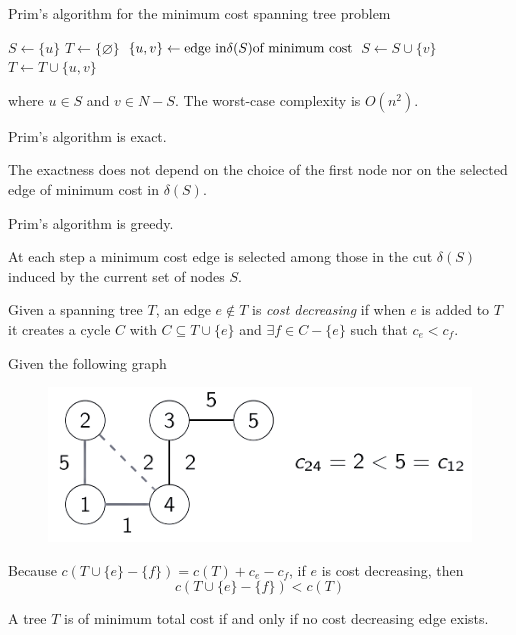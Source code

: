 \documentclass[12pt, a4paper]{report}
\newtheorem[style=M,bodystyle=\normalfont]{theorem}{Theorem}
\newtheorem[style=M,bodystyle=\normalfont]{corollary}{Corollary}
\newtheorem[style=M,bodystyle=\normalfont]{lemma}{Lemma}
\newtheorem[style=M,bodystyle=\normalfont]{definition}{Definition}
\begin{document}
    \begin{algorithm}[H]
        \caption{Prim's algorithm for the minimum cost spanning tree problem}
            \begin{algorithmic}[1]
                \State $S \leftarrow \{u\}$
                \State $T \leftarrow \{\varnothing\}$
                    \State $\{u,v\}\leftarrow \textnormal{edge in} \delta(S) \textnormal{of minimum cost}$
                    \State $S \leftarrow S \cup \{v\}$
                    \State $T \leftarrow T \cup \{u,v\}$
                \EndWhile
            \end{algorithmic}
    \end{algorithm}
    where $u \in S$ and $v \in N-S$. The worst-case complexity is $O(n^2)$. 
    \begin{example}[Proposition]
        Prim's algorithm is exact. 
    \end{example}        
    The exactness does not depend on the choice of the first node nor on the selected edge of minimum cost in $\delta(S)$. 
    \begin{example}[Proposition]
        Prim's algorithm is greedy. 
    \end{example}     
    At each step a minimum cost edge is selected among those in the cut $\delta (S)$ induced by the current set of nodes $S$. 
    \begin{definition}
        Given a spanning tree $T$, an edge $e \notin T$ is \emph{cost decreasing} if when $e$ is added to $T$ it creates a cycle $C$ with $C \subseteq T \cup \{e\}$ and 
        $\exists f \in C-\{e\}$ such that $c_e<c_f$. 
    \end{definition}
    \begin{example}
        Given the following graph
        \begin{figure}[H]
            \centering
            \includegraphics[width=0.5\linewidth]{images/costdecreasing.png}
        \end{figure}
        Because $c(T \cup \{e\}-\{f\})=c(T)+c_e-c_f$, if $e$ is cost decreasing, then
        \[c(T \cup \{e\}-\{f\})<c(T)\]
    \end{example}
    \begin{theorem}
        A tree $T$ is of minimum total cost if and only if no cost decreasing edge exists. 
    \end{theorem}
\end{document}

